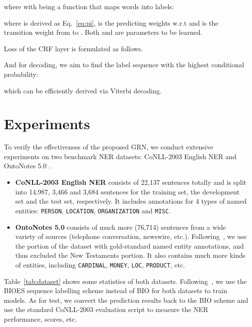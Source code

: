 \documentclass[letterpaper]{article} \usepackage{aaai19}  \usepackage{times}  \usepackage{helvet}  \usepackage{courier}  \usepackage{url}  \usepackage{graphicx}  \usepackage{amsmath}
\newcommand{\ie}{\text{i.e.,}}
\newcommand{\GRN}{GRN}
\begin{document}
where  with  being a function that maps words into labels:

where  is derived as Eq.~\ref{eq:pi},  is the predicting weights w.r.t  and  is the transition weight from  to . Both  and  are parameters to be learned.

Loss of the CRF layer is formulated as follows.

And for decoding, we aim to find the label sequence  with the highest conditional probability:

which can be efficiently derived via Viterbi decoding.


\section{Experiments}
To verify the effectiveness of the proposed \GRN{}, we conduct extensive experiments on two benchmark NER datasets: CoNLL-2003 English NER \cite{tjong2003introduction} and OntoNotes 5.0 \cite{hovy2006ontonotes,pradhan2013towards}.
\begin{itemize}
\item \textbf{CoNLL-2003 English NER} consists of 22,137 sentences totally and is split into 14,987, 3,466 and 3,684 sentences for the training set, the development set and the test set, respectively. It includes annotations for 4 types of named entities: \texttt{PERSON}, \texttt{LOCATION}, \texttt{ORGANIZATION} and \texttt{MISC}. \item \textbf{OntoNotes 5.0} consists of much more (76,714) sentences  from a wide variety of sources (telephone conversation, newswire, etc.). Following~\cite{chiu2016named}, we use the portion of the dataset with gold-standard named entity annotations, and thus excluded the New Testaments portion. It also contains much more kinds of entities, including \texttt{CARDINAL}, \texttt{MONEY}, \texttt{LOC}, \texttt{PRODUCT}, etc.
\end{itemize}
Table~\ref{tab:dataset} shows some statistics of both datasets. Following~\cite{ma2016CNNBLSTMCRF}, we use the BIOES sequence labelling scheme instead of BIO for both datasets to train models. As for test, we convert the prediction results back to the BIO scheme and use the standard CoNLL-2003 evaluation script to measure the NER performance, \ie{}  scores, etc.
\end{document}
